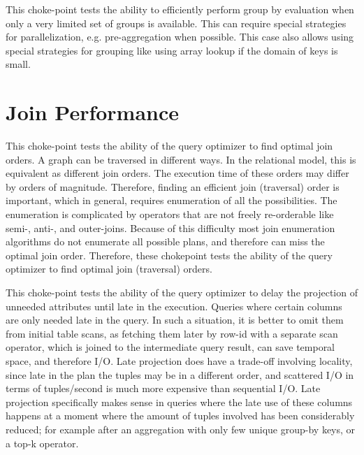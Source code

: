 


This choke-point tests the ability to efficiently perform group by evaluation when only a very limited set of groups is available.  This can require special strategies for parallelization, e.g. pre-aggregation when possible. This case also allows using special strategies for grouping like using array lookup if the domain of keys is small.




\section{Join Performance}


This choke-point tests the ability of the query optimizer to find optimal join orders. A graph can be traversed in different ways. In the relational model, this is equivalent as different join orders.
The execution time of these orders may differ by orders of magnitude. Therefore, finding an efficient join (traversal) order is important, which in general, requires enumeration of all the possibilities.
The enumeration is complicated by operators that are not freely re-orderable like semi-, \mbox{anti-,} and outer-joins. Because of this difficulty most join enumeration algorithms do not enumerate all possible plans, and therefore can miss the optimal join order. Therefore, these chokepoint tests the ability of the query optimizer to find optimal join (traversal) orders.




This choke-point tests the ability of the query optimizer to delay the projection of unneeded attributes until late in the execution. Queries where certain columns are only needed late in the query.
In such a situation, it is better to omit them from initial table scans, as fetching them later by row-id with a separate scan operator, which is joined to the intermediate query result, can save temporal space, and therefore I/O.
Late projection does have a trade-off involving locality, since late in the plan the tuples may be in a different order, and scattered I/O in terms of tuples/second is much more expensive than sequential I/O.
Late projection specifically makes sense in queries where the late use of these columns happens at a moment where the amount of tuples involved has been considerably reduced;
for example after an aggregation with only few unique group-by keys, or a top-k operator.

